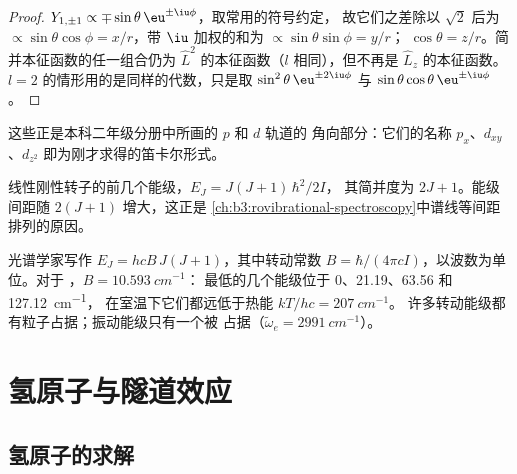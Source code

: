 \begin{proof}
$Y_{1,\pm1} \propto \mp\sin\theta\,\eu^{\pm\iu\phi}$，取常用的符号约定，
故它们之差除以 $\sqrt2$ 后为 $\propto\sin\theta\cos\phi =
x/r$，带 $\iu$ 加权的和为 $\propto\sin\theta\sin\phi = y/r$；
$\cos\theta = z/r$。简并本征函数的任一组合仍为
$\hat L^2$ 的本征函数（$l$ 相同），但不再是 $\hat
L_z$ 的本征函数。$l = 2$ 的情形用的是同样的代数，只是取 $\sin^2\theta\,\eu^{\pm2\iu\phi}$
与 $\sin\theta\cos\theta\,\eu^{\pm\iu\phi}$。
\end{proof}

这些正是本科二年级分册中所画的 $p$ 和 $d$ 轨道的
角向部分：它们的名称 $p_x$、$d_{xy}$、$d_{z^2}$
即为刚才求得的笛卡尔形式。

\begin{omfigure}

{\small 线性刚性转子的前几个能级，$E_J = J(J+1)\,\hbar^2/2I$，
其简并度为 $2J + 1$。能级间距随 $2(J+1)$ 增大，这正是
\cref{ch:b3:rovibrational-spectroscopy}中谱线等间距排列的原因。}
\end{omfigure}

\begin{example}\label{ex:b3:quantum-model-systems:hcl}
光谱学家写作 $E_J = hcB\,J(J+1)$，其中转动常数 $B =
\hbar/(4\pi cI)$，以波数为单位。对于 ，$B = \qty{10.593}{cm^{-1}}$：
最低的几个能级位于 0、21.19、63.56 和 \qty{127.12}{cm^{-1}}，
在室温下它们都远低于热能 $kT/hc = \qty{207}{cm^{-1}}$。
许多转动能级都有粒子占据；振动能级只有一个被
占据（$\tilde\omega_e = \qty{2991}{cm^{-1}}$）。
\end{example}

\section{氢原子与隧道效应}

\subsection*{氢原子的求解}

